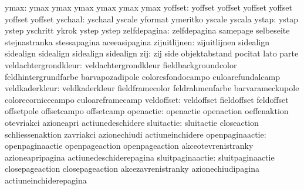                      ymax: ymax                      ymax
                           ymax                      ymax
                           ymax                      ymax %
                  yoffset: yoffset                   yoffset
                           yoffset                   yoffset
                           yoffset                   yoffset %
                  yschaal: yschaal                   yscale
                           yformat                   ymeritko
                           yscale                    yscala %
                    ystap: ystap                     ystep
                           yschritt                  ykrok
                           ystep                     ystep %
             zelfdepagina: zelfdepagina              samepage
                           selbeseite                stejnastranka
                           stessapagina              aceeasipagina
zijuitlijnen: zijuitlijnen sidealign
              sidealign    sidealign
              sidealign    sidealign
                      zij: zij                       side
                           objektabstand             pocitat
                           lato                      parte
     veldachtergrondkleur: veldachtergrondkleur      fieldbackgroundcolor
                           feldhintergrundfarbe      barvapozadipole
                           coloresfondocampo         culoarefundalcamp
           veldkaderkleur: veldkaderkleur            fieldframecolor
                           feldrahmenfarbe           barvarameckupole
                           colorecornicecampo        culoareframecamp
               veldoffset: veldoffset                fieldoffset
                           feldoffset                offsetpole
                           offsetcampo               offsetcamp
                openactie: openactie                 openaction
                           oeffenaktion              otevriakci
                           azioneapri                actiunedeschidere
               sluitactie: sluitactie                closeaction
                           schliessenaktion          zavriakci
                           azionechiudi              actiuneinchidere
          openpaginaactie: openpaginaactie           openpageaction
                           openpageaction            akceotevrenistranky
                           azioneapripagina          actiunedeschiderepagina %
         sluitpaginaactie: sluitpaginaactie          closepageaction
                           closepageaction           akcezavrenistranky
                           azionechiudipagina        actiuneinchiderepagina %
